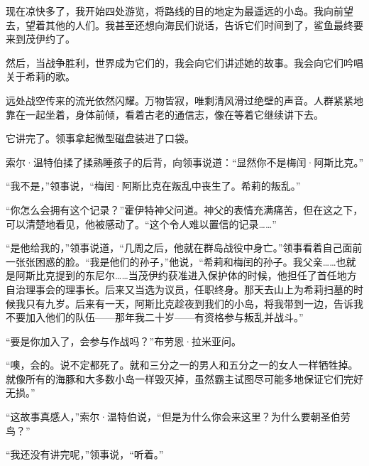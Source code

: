 \documentclass[AutoFakeBold=true]{book}
\begin{document}
现在凉快多了，我开始四处游览，将路线的目的地定为最遥远的小岛。我向前望去，望着其他的人们。我甚至还想向海民们说话，告诉它们时间到了，鲨鱼最终要来到茂伊约了。

然后，当战争胜利，世界成为它们的，我会向它们讲述她的故事。我会向它们吟唱关于希莉的歌。

\vspace*{1em}

远处战空传来的流光依然闪耀。万物皆寂，唯剩清风滑过绝壁的声音。人群紧紧地靠在一起坐着，身体前倾，看着古老的通信志，像在等着它继续讲下去。

它讲完了。领事拿起微型磁盘装进了口袋。

索尔·温特伯揉了揉熟睡孩子的后背，向领事说道：``显然你不是梅闰·阿斯比克。''

``我不是，''领事说，``梅闰·阿斯比克在叛乱中丧生了。希莉的叛乱。''

``你怎么会拥有这个记录？''霍伊特神父问道。神父的表情充满痛苦，但在这之下，可以清楚地看见，他被感动了。``这个令人难以置信的记录……''

``是他给我的，''领事说道，``几周之后，他就在群岛战役中身亡。''领事看着自己面前一张张困惑的脸。``我是他们的孙子，''他说，``希莉和梅闰的孙子。我父亲……也就是阿斯比克提到的东尼尔……当茂伊约获准进入保护体的时候，他担任了首任地方自治理事会的理事长。后来又当选为议员，任职终身。那天去山上为希莉扫墓的时候我只有九岁。后来有一天，阿斯比克趁夜到我们的小岛，将我带到一边，告诉我不要加入他们的队伍——那年我二十岁——有资格参与叛乱并战斗。''

``要是你加入了，会参与作战吗？''布劳恩·拉米亚问。

``噢，会的。说不定都死了。就和三分之一的男人和五分之一的女人一样牺牲掉。就像所有的海豚和大多数小岛一样毁灭掉，虽然霸主试图尽可能多地保证它们完好无损。''

``这故事真感人，''索尔·温特伯说，``但是为什么你会来这里？为什么要朝圣伯劳鸟？''

``我还没有讲完呢，''领事说，``听着。''

\vspace*{1em}
\end{document}
